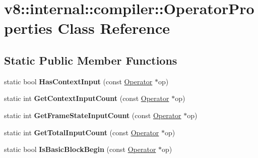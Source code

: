 \hypertarget{classv8_1_1internal_1_1compiler_1_1_operator_properties}{}\section{v8\+:\+:internal\+:\+:compiler\+:\+:Operator\+Properties Class Reference}
\label{classv8_1_1internal_1_1compiler_1_1_operator_properties}
\subsection*{Static Public Member Functions}
\begin{DoxyCompactItemize}
\item 
static bool {\bfseries Has\+Context\+Input} (const \hyperlink{classv8_1_1internal_1_1compiler_1_1_operator}{Operator} $\ast$op)\hypertarget{classv8_1_1internal_1_1compiler_1_1_operator_properties_a91d024c4a206ff40b8babff4247615d9}{}\label{classv8_1_1internal_1_1compiler_1_1_operator_properties_a91d024c4a206ff40b8babff4247615d9}

\item 
static int {\bfseries Get\+Context\+Input\+Count} (const \hyperlink{classv8_1_1internal_1_1compiler_1_1_operator}{Operator} $\ast$op)\hypertarget{classv8_1_1internal_1_1compiler_1_1_operator_properties_a842c644f8823aea5528e4d955917157a}{}\label{classv8_1_1internal_1_1compiler_1_1_operator_properties_a842c644f8823aea5528e4d955917157a}

\item 
static int {\bfseries Get\+Frame\+State\+Input\+Count} (const \hyperlink{classv8_1_1internal_1_1compiler_1_1_operator}{Operator} $\ast$op)\hypertarget{classv8_1_1internal_1_1compiler_1_1_operator_properties_a31fd26fbd89cdacaffc80955f0574e48}{}\label{classv8_1_1internal_1_1compiler_1_1_operator_properties_a31fd26fbd89cdacaffc80955f0574e48}

\item 
static int {\bfseries Get\+Total\+Input\+Count} (const \hyperlink{classv8_1_1internal_1_1compiler_1_1_operator}{Operator} $\ast$op)\hypertarget{classv8_1_1internal_1_1compiler_1_1_operator_properties_a042c21e4fd4504a108aec865df6a99d3}{}\label{classv8_1_1internal_1_1compiler_1_1_operator_properties_a042c21e4fd4504a108aec865df6a99d3}

\item 
static bool {\bfseries Is\+Basic\+Block\+Begin} (const \hyperlink{classv8_1_1internal_1_1compiler_1_1_operator}{Operator} $\ast$op)\hypertarget{classv8_1_1internal_1_1compiler_1_1_operator_properties_a7b8dbf4be8dee6901ecc82f932814a31}{}\label{classv8_1_1internal_1_1compiler_1_1_operator_properties_a7b8dbf4be8dee6901ecc82f932814a31}

\end{DoxyCompactItemize}
